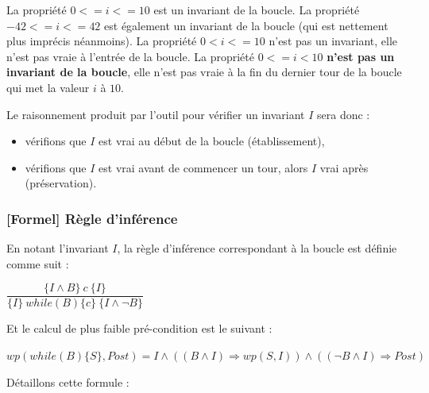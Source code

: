 \documentclass[12pt,francais,]{scrbook}
\providecommand{\tightlist}{%
  \setlength{\itemsep}{0pt}\setlength{\parskip}{0pt}}
\begin{document}
La propriété \(0 <= i <= 10\) est un invariant de la boucle. La
propriété \(-42 <= i <= 42\) est également un invariant de la boucle
(qui est nettement plus imprécis néanmoins). La propriété
\(0 < i <= 10\) n'est pas un invariant, elle n'est pas vraie à l'entrée
de la boucle. La propriété \(0 <= i < 10\) \textbf{n'est pas un
invariant de la boucle}, elle n'est pas vraie à la fin du dernier tour
de la boucle qui met la valeur \(i\) à \(10\).

Le raisonnement produit par l'outil pour vérifier un invariant \(I\)
sera donc :

\begin{itemize}
\tightlist
\item
  vérifions que \(I\) est vrai au début de la boucle (établissement),
\item
  vérifions que \(I\) est vrai avant de commencer un tour, alors \(I\)
  vrai après (préservation).
\end{itemize}

\subsubsection{{[}Formel{]} Règle
d'inférence}\label{formel-ruxe8gle-dinfuxe9rence}

En notant l'invariant \(I\), la règle d'inférence correspondant à la
boucle est définie comme suit :

\begin{center}
\(\dfrac{\{I \wedge B \}\ c\ \{I\}}{\{I\}\ while(B)\{c\}\ \{I \wedge \neg B\}}\)
\end{center}

Et le calcul de plus faible pré-condition est le suivant :

\begin{center}
\(wp(while (B) \{ S \}, Post) = I \wedge ((B \wedge I) \Rightarrow wp(S, I)) \wedge ((\neg B \wedge I) \Rightarrow Post)\)
\end{center}

Détaillons cette formule :
\end{document}
